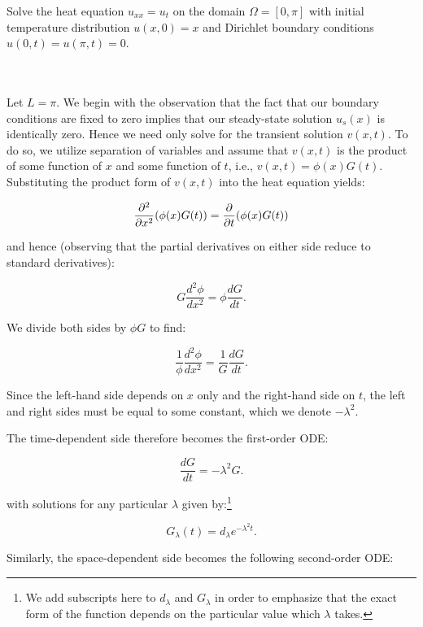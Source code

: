 Solve the heat equation $u_{xx} = u_t$ on the domain $\Omega = [0, \pi]$ with initial temperature distribution 
$u(x, 0) = x$ and Dirichlet boundary conditions $u(0, t) = u(\pi, t) = 0$.

\begin{solution}\ \\\\
    Let $L = \pi$. We begin with the observation that the fact that our boundary conditions are fixed to zero implies 
    that our steady-state solution $u_s(x)$ is identically zero. Hence we need only solve for the transient solution 
    $v(x, t)$.  To do so, we utilize separation of variables and assume that $v(x, t)$ is the product of some function 
    of $x$ and some function of $t$, i.e., $v(x, t) = \phi(x) G(t)$. Substituting the product form of $v(x, t)$ into the
    heat equation yields:

    $$
    \frac{\partial^2}{\partial x^2} (\phi(x) G(t)) = \frac{\partial}{\partial t} (\phi(x) G(t)) \\
    $$

    and hence (observing that the partial derivatives on either side reduce to standard derivatives):

    $$
    G \frac{d^2 \phi}{d x^2} = \phi \frac{d G}{d t}.
    $$

    We divide both sides by $\phi G$ to find:

    $$
    \frac{1}{\phi} \frac{d^2 \phi}{d x^2} = \frac{1}{G} \frac{d G}{d t}.
    $$

    Since the left-hand side depends on $x$ only and the right-hand side on $t$, the left and right sides must be equal
    to some constant, which we denote $-\lambda^2$.

    The time-dependent side therefore becomes the first-order ODE:

    $$
    \frac{d G}{d t} = -\lambda^2 G.
    $$

    with solutions for any particular $\lambda$ given by:\footnote{
        We add subscripts here to $d_{\lambda}$ and $G_{\lambda}$ in order to emphasize that the exact form of the 
        function depends on the particular value which $\lambda$ takes.
    }

    \begin{equation}
    G_{\lambda}(t) = d_{\lambda}e^{-\lambda^2 t}.
    \end{equation}

    Similarly, the space-dependent side becomes the following second-order ODE:


\end{solution}
